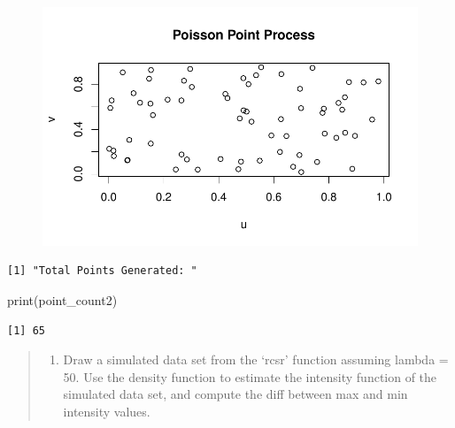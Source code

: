 \documentclass[
  letterpaper,
  DIV=11,
  numbers=noendperiod]{scrartcl}
\newenvironment{Shaded}{\begin{snugshade}}{\end{snugshade}}
\newcommand{\FunctionTok}[1]{\textcolor[rgb]{0.28,0.35,0.67}{#1}}
\newcommand{\NormalTok}[1]{\textcolor[rgb]{0.00,0.23,0.31}{#1}}
\newcommand{\OtherTok}[1]{\textcolor[rgb]{0.00,0.23,0.31}{#1}}
\newcommand{\SpecialCharTok}[1]{\textcolor[rgb]{0.37,0.37,0.37}{#1}}
\newcommand{\StringTok}[1]{\textcolor[rgb]{0.13,0.47,0.30}{#1}}
\providecommand{\tightlist}{%
  \setlength{\itemsep}{0pt}\setlength{\parskip}{0pt}}\usepackage{longtable,booktabs,array}
\begin{document}
\begin{figure}[H]

{\centering \includegraphics{robby_homework1_files/figure-pdf/unnamed-chunk-9-1.pdf}

}

\end{figure}

\begin{Shaded}
\end{Shaded}

\begin{verbatim}
[1] "Total Points Generated: "
\end{verbatim}

\begin{Shaded}
\begin{Highlighting}[]
\FunctionTok{print}\NormalTok{(point\_count2)}
\end{Highlighting}
\end{Shaded}

\begin{verbatim}
[1] 65
\end{verbatim}

\begin{quote}
\begin{enumerate}
\def\labelenumi{\arabic{enumi}.}
\setcounter{enumi}{1}
\tightlist
\item
  Draw a simulated data set from the `rcsr' function assuming lambda =
  50. Use the density function to estimate the intensity function of the
  simulated data set, and compute the diff between max and min intensity
  values.
\end{enumerate}
\end{quote}
\end{document}
